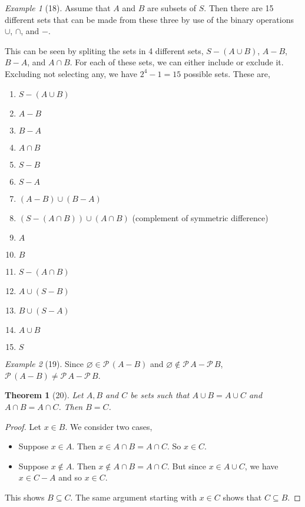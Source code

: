 \documentclass[12pt]{article}
\theoremstyle{plain}
\newtheorem*{exthm}{Theorem}
\theoremstyle{remark}
\newtheorem*{eg}{Example}
\theoremstyle{definition}
\theoremstyle{remark}
\newcommand{\powerset}{\mathscr{P}\,}
\begin{document}
\begin{eg}[18]
  Assume that $A$ and $B$ are subsets of $S$. Then there are 15 different sets that can be made from these three by use of the binary operations $\cup$, $\cap$, and $-$.

  This can be seen by spliting the sets in 4 different sets, $S - (A \cup B)$, $A - B$, $B - A$, and $A \cap B$. For each of these sets, we can either include or exclude it. Excluding not selecting any, we have $2^4 - 1 = 15$ possible sets. These are,

  \begin{enumerate}
    \item $S - (A \cup B)$
    \item $A - B$
    \item $B - A$
    \item $A \cap B$
    \item $S - B$
    \item $S - A$
    \item $(A - B) \cup (B - A)$
    \item $(S - (A \cap B)) \cup (A \cap B)$ (complement of symmetric difference)
    \item $A$
    \item $B$
    \item $S - (A \cap B)$
    \item $A \cup (S - B)$
    \item $B \cup (S - A)$
    \item $A \cup B$
    \item $S$
  \end{enumerate}
\end{eg}

\begin{eg}[19]
  Since $\varnothing \in \powerset (A - B)$ and $\varnothing \not\in \powerset A - \powerset B$, $\powerset(A - B) \neq \powerset A - \powerset B$.
\end{eg}

\begin{exthm}[20]
  Let $A, B$ and $C$ be sets such that $A \cup B = A \cup C$ and $A \cap B = A \cap C$. Then $B = C$.
\end{exthm}
\begin{proof}
  Let $x \in B$. We consider two cases,
  \begin{itemize}
    \item Suppose $x \in A$. Then $x \in A \cap B = A \cap C$. So $x \in C$.
    \item Suppose $x \not\in A$. Then $x \not\in A \cap B = A \cap C$. But since $x \in A \cup C$, we have $x \in C - A$ and so $x \in C$.
  \end{itemize}
  This shows $B \subseteq C$. The same argument starting with $x \in C$ shows that $C \subseteq B$.
\end{proof}
\end{document}
